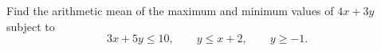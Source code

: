 Find the arithmetic mean of the maximum and minimum values of $4x+3y$ subject to
\[
3x+5y\le10,\qquad y\le x+2,\qquad y\ge-1 .
\]
